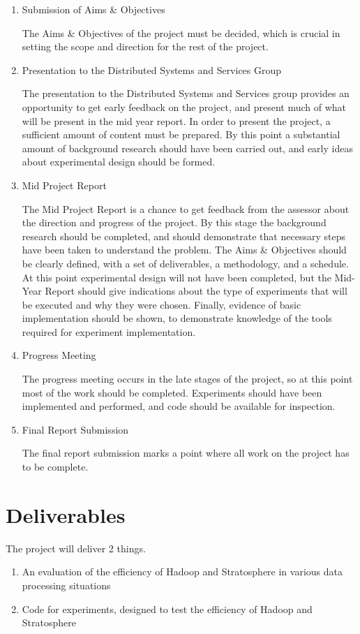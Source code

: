 \begin{enumerate}
	\item Submission of Aims \& Objectives

	The Aims \& Objectives of the project must be decided, which is crucial in setting the scope and direction for the rest of the project.

	\item Presentation to the Distributed Systems and Services Group

	The presentation to the Distributed Systems and Services group provides an opportunity to get early feedback on the project, and present much of what will be present in the mid year report. In order to present the project, a sufficient amount of content must be prepared. By this point a substantial amount of background research should have been carried out, and early ideas about experimental design should be formed.

	\item Mid Project Report

	The Mid Project Report is a chance to get feedback from the assessor about the direction and progress of the project. By this stage the background research should be completed, and should demonstrate that necessary steps have been taken to understand the problem. The Aims \& Objectives should be clearly defined, with a set of deliverables, a methodology, and a schedule. At this point experimental design will not have been completed, but the Mid-Year Report should give indications about the type of experiments that will be executed and why they were chosen. Finally, evidence of basic implementation should be shown, to demonstrate knowledge of the tools required for experiment implementation. 

	\item Progress Meeting

	The progress meeting occurs in the late stages of the project, so at this point most of the work should be completed. Experiments should have been implemented and performed, and code should be available for inspection.

	\item Final Report Submission
	
	The final report submission marks a point where all work on the project has to be complete. 
\end{enumerate}

\section{Deliverables}
The project will deliver 2 things.

\begin{enumerate}
	\item An evaluation of the efficiency of Hadoop and Stratosphere in various data processing situations
	\item Code for experiments, designed to test the efficiency of Hadoop and Stratosphere
\end{enumerate}